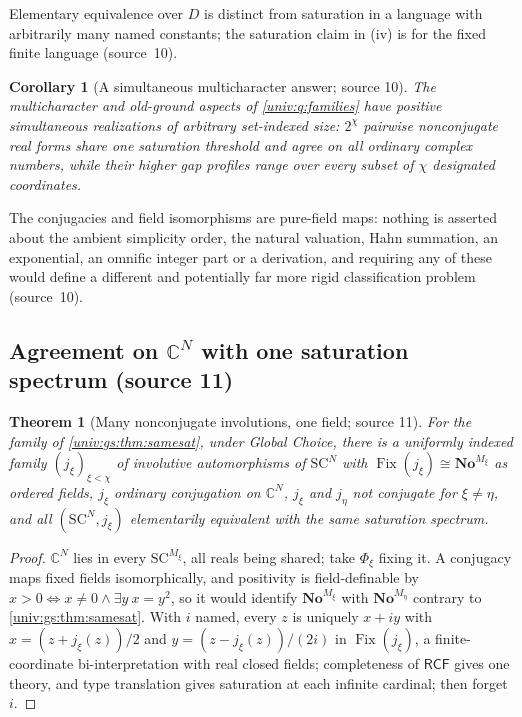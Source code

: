 \documentclass[11pt,letterpaper]{article}
\numberwithin{equation}{section}
\newtheorem{theorem}{Theorem}[section]
\newtheorem{corollary}[corollary]{Corollary}
\theoremstyle{definition}
\theoremstyle{remark}
\newcommand{\No}{\mathbf{No}}
\newcommand{\SC}{\mathrm{SC}}
\newcommand{\SCN}{\SC^{N}}
\newcommand{\C}{\mathbb C}
\newcommand{\Fix}{\operatorname{Fix}}
\newcommand{\RCF}{\mathsf{RCF}}
\begin{document}
Elementary equivalence over $D$ is distinct from saturation in a language with arbitrarily many
named constants; the saturation claim in (iv) is for the fixed finite language (source~10).

\begin{corollary}[A simultaneous multicharacter answer; source 10]\label{univ:gs:cor:multichar}
The multicharacter and old-ground aspects of \cref{univ:q:families} have positive simultaneous
realizations of arbitrary set-indexed size: $2^\chi$ pairwise nonconjugate real forms share one
saturation threshold and agree on all ordinary complex numbers, while their higher gap profiles
range over every subset of $\chi$ designated coordinates.
\end{corollary}

The conjugacies and field isomorphisms are pure-field maps: nothing is asserted about the ambient
simplicity order, the natural valuation, Hahn summation, an exponential, an omnific integer part
or a derivation, and requiring any of these would define a different and potentially far more
rigid classification problem (source~10).

\subsection{\texorpdfstring{Agreement on $\C^N$ with one saturation spectrum (source 11)}{Agreement on C\^{}N with one saturation spectrum (source 11)}}

\begin{theorem}[Many nonconjugate involutions, one field; source 11]\label{univ:gs:thm:samesatinvolutions}
For the family of \cref{univ:gs:thm:samesat}, under Global Choice, there is a uniformly indexed
family $(j_\xi)_{\xi<\chi}$ of involutive automorphisms of $\SCN$ with $\Fix(j_\xi)\cong\No^{M_\xi}$
as ordered fields, $j_\xi$ ordinary conjugation on $\C^N$, $j_\xi$ and $j_\eta$ not conjugate for
$\xi\ne\eta$, and all $(\SCN,j_\xi)$ elementarily equivalent with the same saturation spectrum.
\end{theorem}
\begin{proof}
$\C^N$ lies in every $\SC^{M_\xi}$, all reals being shared; take $\Phi_\xi$ fixing it. A conjugacy
maps fixed fields isomorphically, and positivity is field-definable by
$x>0\iff x\ne0\wedge\exists y\ x=y^2$, so it would identify $\No^{M_\xi}$ with $\No^{M_\eta}$
contrary to \cref{univ:gs:thm:samesat}. With $i$ named, every $z$ is uniquely
$x+iy$ with $x=(z+j_\xi(z))/2$ and $y=(z-j_\xi(z))/(2i)$ in $\Fix(j_\xi)$, a finite-coordinate
bi-interpretation with real closed fields; completeness of $\RCF$ gives one theory, and type
translation gives saturation at each infinite cardinal; then forget $i$.
\end{proof}
\end{document}
